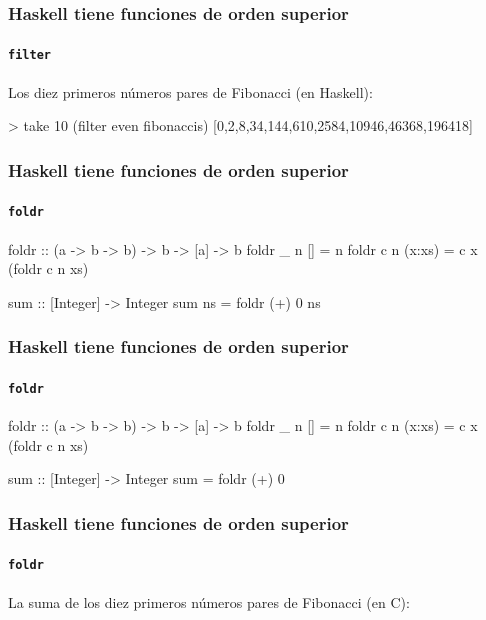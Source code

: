 \documentclass[spanish]{beamer}
\begin{document}
\begin{frame}[fragile]
  \frametitle{Haskell tiene funciones de orden superior}
  \framesubtitle{\texttt{filter}}

  Los diez primeros números pares de Fibonacci (en Haskell):
  \begin{code}
> take 10 (filter even fibonaccis)
[0,2,8,34,144,610,2584,10946,46368,196418]
  \end{code}
\end{frame}


\begin{frame}[fragile]
  \frametitle{Haskell tiene funciones de orden superior}
  \framesubtitle{\texttt{foldr}}

  \begin{code}
foldr :: (a -> b -> b) -> b -> [a] -> b
foldr _ n []     = n
foldr c n (x:xs) = c x (foldr c n xs)
  \end{code}

  \begin{code}
sum :: [Integer] -> Integer
sum ns = foldr (+) 0 ns
  \end{code}
\end{frame}


\begin{frame}[fragile]
  \frametitle{Haskell tiene funciones de orden superior}
  \framesubtitle{\texttt{foldr}}

  \begin{code}
foldr :: (a -> b -> b) -> b -> [a] -> b
foldr _ n []     = n
foldr c n (x:xs) = c x (foldr c n xs)
  \end{code}

  \begin{code}
sum :: [Integer] -> Integer
sum = foldr (+) 0
  \end{code}
\end{frame}


\begin{frame}[fragile]
  \frametitle{Haskell tiene funciones de orden superior}
  \framesubtitle{\texttt{foldr}}

  La suma de los diez primeros números pares de Fibonacci (en C):
\end{frame}
\end{document}
